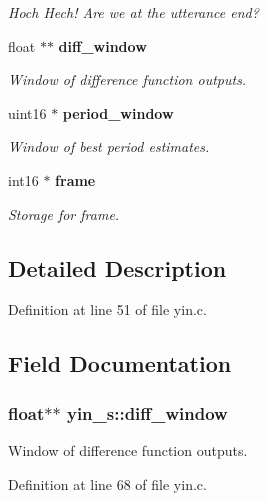\begin{DoxyCompactItemize}
\begin{DoxyCompactList}\small\item\em Hoch Hech! Are we at the utterance end? \end{DoxyCompactList}\item 
float $\ast$$\ast$ {\bf diff\+\_\+window}
\begin{DoxyCompactList}\small\item\em Window of difference function outputs. \end{DoxyCompactList}\item 
uint16 $\ast$ {\bf period\+\_\+window}
\begin{DoxyCompactList}\small\item\em Window of best period estimates. \end{DoxyCompactList}\item 
int16 $\ast$ {\bf frame}\label{structyin__s_adb8a1fa6168286b87244f35361a64926}

\begin{DoxyCompactList}\small\item\em Storage for frame. \end{DoxyCompactList}\end{DoxyCompactItemize}


\subsection{Detailed Description}


Definition at line 51 of file yin.\+c.



\subsection{Field Documentation}
\subsubsection[{diff\+\_\+window}]{\setlength{\rightskip}{0pt plus 5cm}float$\ast$$\ast$ yin\+\_\+s\+::diff\+\_\+window}\label{structyin__s_a41981e290a7b03ae2dae834d4b6bf930}


Window of difference function outputs. 



Definition at line 68 of file yin.\+c.



